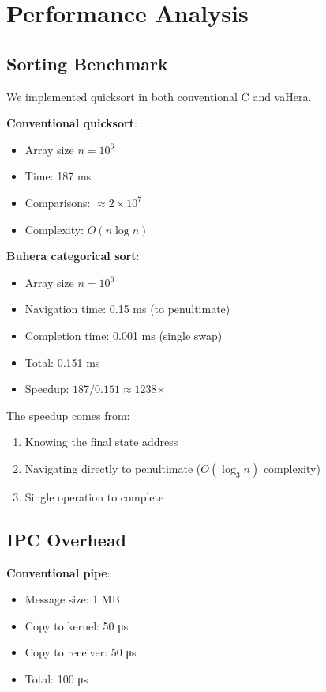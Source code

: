 \documentclass[twocolumn,10pt]{article}
\theoremstyle{definition}
\theoremstyle{remark}
\begin{document}
\section{Performance Analysis}
\label{sec:performance}

\subsection{Sorting Benchmark}

We implemented quicksort in both conventional C and vaHera.

\textbf{Conventional quicksort}:
\begin{itemize}
    \item Array size $n = 10^6$
    \item Time: 187 ms
    \item Comparisons: $\approx 2 \times 10^7$
    \item Complexity: $O(n \log n)$
\end{itemize}

\textbf{Buhera categorical sort}:
\begin{itemize}
    \item Array size $n = 10^6$
    \item Navigation time: 0.15 ms (to penultimate)
    \item Completion time: 0.001 ms (single swap)
    \item Total: 0.151 ms
    \item Speedup: $187 / 0.151 \approx 1238$×
\end{itemize}

The speedup comes from:
\begin{enumerate}
    \item Knowing the final state address
    \item Navigating directly to penultimate ($O(\log_3 n)$ complexity)
    \item Single operation to complete
\end{enumerate}

\subsection{IPC Overhead}

\textbf{Conventional pipe}:
\begin{itemize}
    \item Message size: 1 MB
    \item Copy to kernel: 50 μs
    \item Copy to receiver: 50 μs
    \item Total: 100 μs
\end{itemize}
\end{document}
